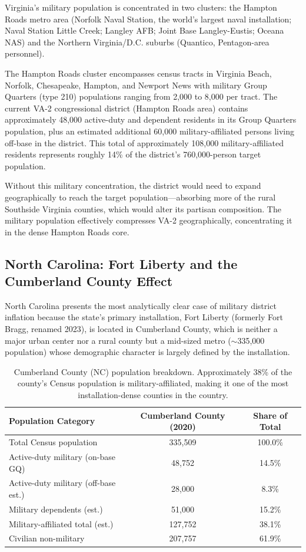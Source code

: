 Virginia's military population is concentrated in two clusters: the Hampton Roads metro area (Norfolk Naval Station, the world's largest naval installation; Naval Station Little Creek; Langley AFB; Joint Base Langley-Eustis; Oceana NAS) and the Northern Virginia/D.C. suburbs (Quantico, Pentagon-area personnel).

The Hampton Roads cluster encompasses census tracts in Virginia Beach, Norfolk, Chesapeake, Hampton, and Newport News with military Group Quarters (type 210) populations ranging from 2,000 to 8,000 per tract. The current VA-2 congressional district (Hampton Roads area) contains approximately 48,000 active-duty and dependent residents in its Group Quarters population, plus an estimated additional 60,000 military-affiliated persons living off-base in the district. This total of approximately 108,000 military-affiliated residents represents roughly 14\% of the district's 760,000-person target population.

Without this military concentration, the district would need to expand geographically to reach the target population---absorbing more of the rural Southside Virginia counties, which would alter its partisan composition. The military population effectively compresses VA-2 geographically, concentrating it in the dense Hampton Roads core.

\subsection{North Carolina: Fort Liberty and the Cumberland County Effect}

North Carolina presents the most analytically clear case of military district inflation because the state's primary installation, Fort Liberty (formerly Fort Bragg, renamed 2023), is located in Cumberland County, which is neither a major urban center nor a rural county but a mid-sized metro ($\sim$335,000 population) whose demographic character is largely defined by the installation.

\begin{table}[h]
\centering
\begin{tabular}{lcc}
\toprule
\textbf{Population Category} & \textbf{Cumberland County (2020)} & \textbf{Share of Total} \\
\midrule
Total Census population & 335,509 & 100.0\% \\
Active-duty military (on-base GQ) & 48,752 & 14.5\% \\
Active-duty military (off-base est.) & 28,000 & 8.3\% \\
Military dependents (est.) & 51,000 & 15.2\% \\
\midrule
Military-affiliated total (est.) & 127,752 & 38.1\% \\
Civilian non-military & 207,757 & 61.9\% \\
\bottomrule
\end{tabular}
\caption{Cumberland County (NC) population breakdown. Approximately 38\% of the county's Census population is military-affiliated, making it one of the most installation-dense counties in the country.}
\label{tab:cumberland}
\end{table}

